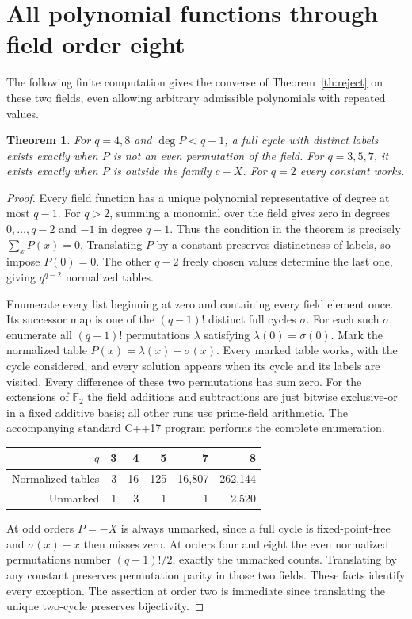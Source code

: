 \documentclass[10pt]{article}
\newtheorem{theorem}{Theorem}
\newcommand{\F}{\mathbb F}
\begin{document}
\section{All polynomial functions through field order eight}
The following finite computation gives the converse of Theorem~\ref{th:reject} on these two fields, even allowing arbitrary admissible polynomials with repeated values.
\begin{theorem}
For $q=4,8$ and $\deg P<q-1$, a full cycle with distinct labels exists exactly when $P$ is not an even permutation of the field. For $q=3,5,7$, it exists exactly when $P$ is outside the family $c-X$. For $q=2$ every constant works.
\end{theorem}
\begin{proof}
Every field function has a unique polynomial representative of degree at most $q-1$. For $q>2$, summing a monomial over the field gives zero in degrees $0,\ldots,q-2$ and $-1$ in degree $q-1$. Thus the condition in the theorem is precisely $\sum_x P(x)=0$. Translating $P$ by a constant preserves distinctness of labels, so impose $P(0)=0$. The other $q-2$ freely chosen values determine the last one, giving $q^{q-2}$ normalized tables.

Enumerate every list beginning at zero and containing every field element once. Its successor map is one of the $(q-1)!$ distinct full cycles $\sigma$. For each such $\sigma$, enumerate all $(q-1)!$ permutations $\lambda$ satisfying $\lambda(0)=\sigma(0)$. Mark the normalized table $P(x)=\lambda(x)-\sigma(x)$. Every marked table works, with the cycle considered, and every solution appears when its cycle and its labels are visited. Every difference of these two permutations has sum zero. For the extensions of $\F_2$ the field additions and subtractions are just bitwise exclusive-or in a fixed additive basis; all other runs use prime-field arithmetic. The accompanying standard C++17 program performs the complete enumeration.
\begin{center}
\begin{tabular}{rrrrrr}\toprule
$q$&3&4&5&7&8\\\midrule
Normalized tables&3&16&125&16,807&262,144\\
Unmarked&1&3&1&1&2,520\\\bottomrule
\end{tabular}
\end{center}
At odd orders $P=-X$ is always unmarked, since a full cycle is fixed-point-free and $\sigma(x)-x$ then misses zero. At orders four and eight the even normalized permutations number $(q-1)!/2$, exactly the unmarked counts. Translating by any constant preserves permutation parity in those two fields. These facts identify every exception. The assertion at order two is immediate since translating the unique two-cycle preserves bijectivity.
\end{proof}
\end{document}
